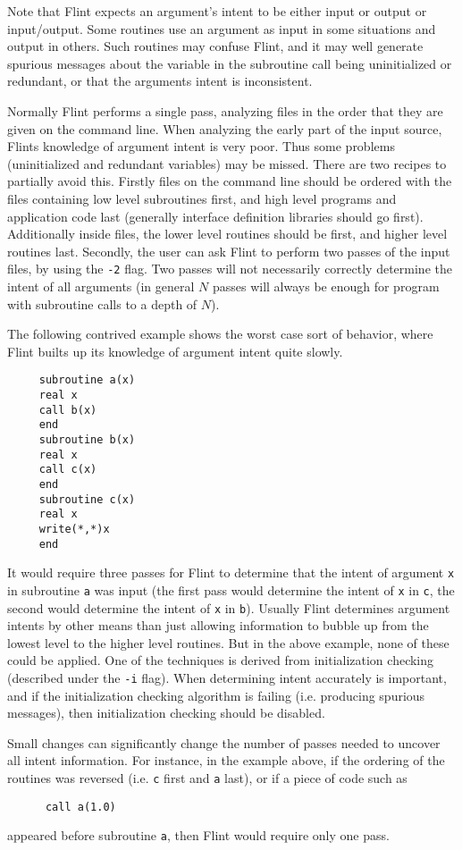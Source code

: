 Note that Flint expects an argument's intent to be either input or output
or input/output. Some routines use an argument as input in some situations
and output in others. Such routines may confuse Flint, and it
may well generate spurious messages about the variable in the subroutine
call being uninitialized or redundant, or that the arguments intent is
inconsistent.

Normally Flint performs a single pass, analyzing files in the order that they
are given on the command line. When analyzing the early part of the
input source, Flints knowledge of argument intent is very poor. Thus some
problems (uninitialized and redundant variables) may be missed. There are
two recipes to partially avoid this. Firstly files on the command line
should be ordered with the files containing low level subroutines first,
and high level programs and application code last (generally interface
definition libraries should go first). Additionally inside files, the lower
level routines should be first, and higher level routines last. Secondly,
the user can ask Flint to perform two passes of the input files, by using
the {\tt -2} flag. Two passes will not necessarily correctly
determine the intent of all arguments  (in general $N$ passes will always
be enough for program with subroutine calls to a depth of $N$).

The following contrived example shows the worst case sort of behavior,
where Flint builts up its knowledge of argument intent quite slowly.
\begin{verbatim}
     subroutine a(x)
     real x
     call b(x)
     end
     subroutine b(x)
     real x
     call c(x)
     end
     subroutine c(x)
     real x
     write(*,*)x
     end
\end{verbatim}
It would require three passes for Flint to determine that the
intent of argument {\tt x} in subroutine {\tt a} was input
(the first pass would determine the intent of {\tt x} in {\tt c}, the
second would determine the intent of {\tt x} in {\tt b}). Usually
Flint determines argument intents by other means than just allowing information
to bubble up from the lowest level to the higher level routines. But in the
above example, none of these could be applied. One of the techniques is
derived from initialization checking (described under the {\tt -i} flag).
When determining intent accurately is important, and if the initialization
checking algorithm is failing (i.e. producing spurious messages), then
initialization checking should be disabled.

Small changes can significantly change the number of passes needed to uncover
all intent information. For instance, in the example above, if
the ordering of the routines was reversed (i.e. {\tt c} first and {\tt a}
last), or if a piece of code such as
\begin{verbatim}
      call a(1.0)
\end{verbatim}
appeared before subroutine {\tt a}, then Flint would require only one pass.

